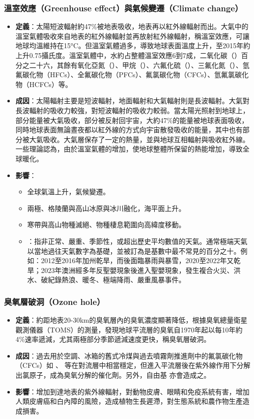 \documentclass[a4paper,12pt]{report}
\begin{document}
\subsubsection{溫室效應（Greenhouse effect）與氣候變遷（Climate change）}
\begin{itemize}
    \item \textbf{定義}：太陽短波輻射約47\%被地表吸收，地表再以紅外線輻射而出。大氣中的溫室氣體吸收來自地表的紅外線輻射並再放射紅外線輻射，稱溫室效應，可讓地球均溫維持在15°C。但溫室氣體過多，導致地球表面溫度上升，至2015年約上升0.75攝氏度。溫室氣體中，水約占整體溫室效應6到7成，二氧化碳（）百分之二十六，其餘有氧化亞氮（）、甲烷（）、六氟化硫（）、三氟化氮（）、氫氟碳化物（HFCs）、全氟碳化物（PFCs）、氟氯碳化物（CFCs）、氫氟氯碳化物（HCFCs）等。
    \item \textbf{成因}：太陽輻射主要是短波輻射，地面輻射和大氣輻射則是長波輻射。大氣對長波輻射的吸收力較強，對短波輻射的吸收力較弱。當太陽光照射到地球上，部分能量被大氣吸收，部分被反射回宇宙，大約47\%的能量被地球表面吸收，同時地球表面無論晝夜都以紅外線的方式向宇宙散發吸收的能量，其中也有部分被大氣吸收。大氣層保存了一定的熱量，並與地球互相輻射與吸收紅外線。一些理論認為，由於溫室氣體的增加，使地球整體所保留的熱能增加，導致全球暖化。
    \item \textbf{影響}：
    \begin{itemize}
        \item 全球氣溫上升，氣候變遷。
        \item 兩極、格陵蘭與高山冰原與冰川融化，海平面上升。
        \item 寒帶與高山物種滅絕、物種棲息範圍向高緯度移動。
        \item {}：指非正常、嚴重、季節性，或超出歷史平均數值的天氣。通常極端天氣以當地過往天氣數字為基礎，並被訂為是基數中最不常見的百分之十。例如：2012至2016年加州乾旱，而後面臨暴雨與暴雪，2020至2022年又乾旱；2023年澳洲經多年反聖嬰現象後進入聖嬰現象，發生複合火災、洪水、破紀錄熱浪、暖冬、極端降雨、嚴重風暴事件。
    \end{itemize}
\end{itemize}
\subsubsection{臭氧層破洞（Ozone hole）}
\begin{itemize}
    \item \textbf{定義}：約距地表20-30km的臭氧層內的臭氧濃度顯著降低，根據臭氧總量衛星觀測儀器（TOMS）的測量，發現地球平流層的臭氧自1970年起以每10年約4\%速率遞減，尤其兩極部分季節遞減速度更快，稱臭氧層破洞。
    \item \textbf{成因}：過去用於空調、冰箱的舊式冷煤與過去噴霧劑推進劑中的氟氯碳化物（CFCs）如 、 等在對流層中相當穩定，但進入平流層後在紫外線作用下分解出氯原子，成為臭氧分解的催化劑。另外，自由基  亦會造成之。
    \item \textbf{影響}：增加到達地表的紫外線輻射，對動物皮膚、眼睛和免疫系統有害，增加人類皮膚癌和白內障的風險，造成植物生長遲滯，對生態系統和農作物生產造成損害。
\end{itemize}
\end{document}
